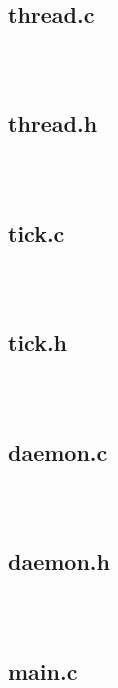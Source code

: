 \documentclass{article}
\begin{document}
\begin{verbatim}



\end{verbatim}

\subsection*{thread.c}

\begin{verbatim}



\end{verbatim}

\subsection*{thread.h}

\begin{verbatim}



\end{verbatim}

\subsection*{tick.c}

\begin{verbatim}



\end{verbatim}

\subsection*{tick.h}

\begin{verbatim}



\end{verbatim}

\subsection*{daemon.c}

\begin{verbatim}



\end{verbatim}

\subsection*{daemon.h}

\begin{verbatim}



\end{verbatim}

\subsection*{main.c}

\begin{verbatim}



\end{verbatim}
\end{document}

